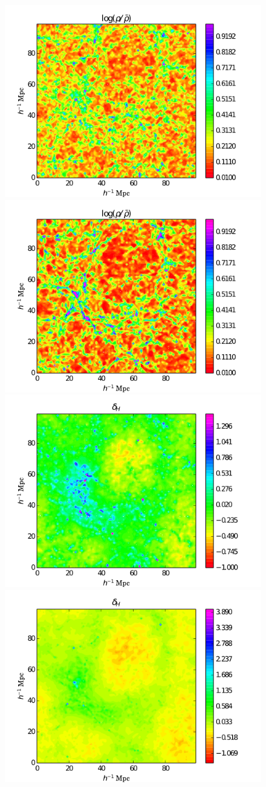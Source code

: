 \documentclass[twocolumns]{emulateapj}
\begin{document}
\begin{figure}
  \centering
\includegraphics[width = .45\textwidth ]{data_rho_z3_qso4.png}
\includegraphics[width = .45\textwidth ]{data_rho_z1_qso4.png}
\includegraphics[width = .45\textwidth ]{data_delta_z3_gal2.png}
\includegraphics[width = .45\textwidth ]{data_delta_z1_gal2.png}


\end{figure}
\end{document}
